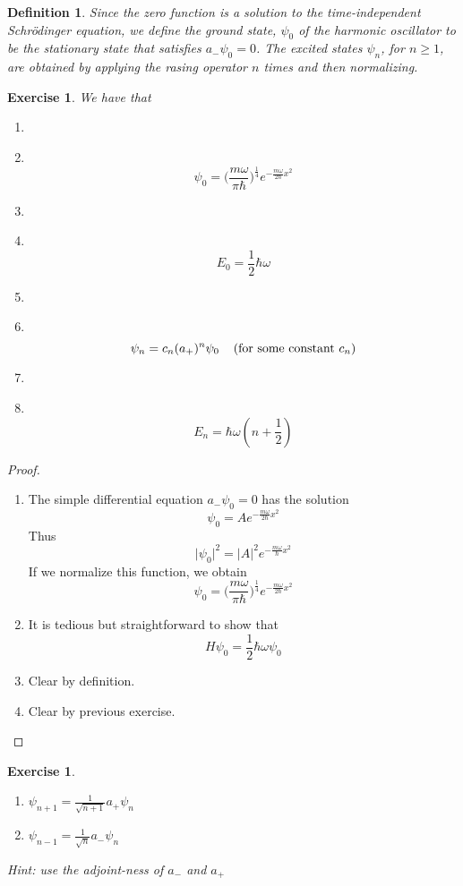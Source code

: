 \documentclass[12pt]{amsart}
\newtheorem{defn}[thm]{Definition}
\newtheorem{ex}[thm]{Exercise}
\newcommand{\sch}{Schr\"{o}dinger }
\newcommand\Item[1][]{%
  \ifx\relax#1\relax  \item \else \item[#1] \fi
  \abovedisplayskip=0pt\abovedisplayshortskip=0pt~\vspace*{-\baselineskip}}
\newcommand{\om}{\omega}
\begin{document}
\begin{defn}
Since the zero function is a solution to the time-independent \sch equation, we define the ground state, $\psi_0$ of the harmonic oscillator to be the stationary state that satisfies $a_-\psi_0 = 0$. The excited states $\psi_n$, for $n \geq 1$, are obtained by applying the rasing operator $n$ times and then normalizing.
\end{defn}

\begin{ex}
We have that
\begin{enumerate}
\Item $$\psi_0= \bigg(\frac{m \om}{ \pi \hbar}\bigg)^{\frac{1}{4}}e^{-\frac{m \om}{2 \hbar}x^2}$$\vspace{2mm}
\Item $$E_0 = \frac{1}{2}\hbar \om$$ \vspace{2mm}
\Item $$\psi_n = c_n(a_+)^n\psi_0 \hspace{.4cm} (\text{for some constant } c_n)$$ \vspace{2mm}
\Item $$E_n = \hbar \om (n + \frac{1}{2})$$
\end{enumerate}

\end{ex}

\begin{proof}\
\begin{enumerate}
\item The simple differential equation $a_-\psi_0 = 0$ has the solution $$\psi_0 = Ae^{-\frac{m \om}{2 \hbar}x^2}$$ Thus $$\vert \psi_0\vert^2 = \vert A \vert^2 e^{-\frac{m \om}{ \hbar}x^2}$$ If we normalize this function, we obtain $$\psi_0= \bigg( \frac{m \om}{ \pi \hbar} \bigg)^{\frac{1}{4}} e^{-\frac{m \om}{2 \hbar}x^2}$$
\item It is tedious but straightforward to show that $$H\psi_0 = \frac{1}{2}\hbar \om\psi_0$$
\item Clear by definition.
\item Clear by previous exercise.
\end{enumerate} 
\end{proof}

\begin{ex}
\begin{enumerate}\
\item $\psi_{n+1} = \frac{1}{\sqrt{n+1}} a_+\psi_n $
\item $\psi_{n-1} = \frac{1}{\sqrt{n}} a_- \psi_n $

\end{enumerate}
Hint: use the adjoint-ness of $a_-$ and $a_+$
\end{ex}
\end{document}
